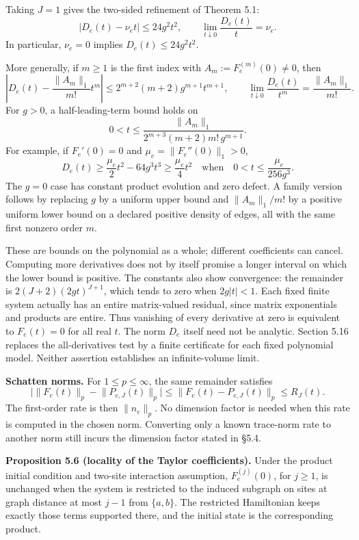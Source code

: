 \documentclass[
  11pt,
]{article}
\begin{document}
Taking \(J=1\) gives the two-sided refinement of Theorem 5.1:
\[
 |D_e(t)-\nu_e t|\leq24g^2t^2,\qquad
 \lim_{t\downarrow0}\frac{D_e(t)}t=\nu_e.
\]
In particular, \(\nu_e=0\) implies \(D_e(t)\leq24g^2t^2\).

More generally, if \(m\geq1\) is the first index with
\(A_m:=F_e^{(m)}(0)\ne0\), then
\[
 \left|D_e(t)-\frac{\lVert A_m\rVert_1}{m!}t^m\right|
 \leq2^{m+2}(m+2)g^{m+1}t^{m+1},
 \qquad
 \lim_{t\downarrow0}\frac{D_e(t)}{t^m}=\frac{\lVert A_m\rVert_1}{m!}.
\]
For \(g>0\), a half-leading-term bound holds on
\[
 0<t\leq
 \frac{\lVert A_m\rVert_1}{2^{m+3}(m+2)m!\,g^{m+1}}.
\]
For example, if \(F_e'(0)=0\) and \(\mu_e=\lVert F_e''(0)\rVert_1>0\),
\[
 D_e(t)\geq\frac{\mu_e}{2}t^2-64g^3t^3
 \geq\frac{\mu_e}{4}t^2
 \quad\text{when}\quad
 0<t\leq\frac{\mu_e}{256g^3}.
\]
The \(g=0\) case has constant product evolution and zero defect.
A family version follows by replacing \(g\) by a uniform upper bound and
\(\lVert A_m\rVert_1/m!\) by a positive uniform lower bound on a declared positive
density of edges, all with the same first nonzero order \(m\).

These are bounds on the polynomial as a whole; different coefficients can
cancel. Computing more derivatives does not by itself promise a longer
interval on which the lower bound is positive. The constants also show
convergence: the remainder is \(2(J+2)(2gt)^{J+1}\), which tends to zero
when \(2g|t|<1\). Each fixed finite system actually has an entire
matrix-valued residual, since matrix exponentials and products are entire.
Thus vanishing of every derivative at zero is equivalent to
\(F_e(t)=0\) for all real \(t\). The norm \(D_e\) itself need not be analytic.
Section 5.16 replaces the all-derivatives test by a finite certificate for each fixed polynomial model. Neither assertion establishes an infinite-volume limit.

\textbf{Schatten norms.} For \(1\leq p\leq\infty\), the same remainder satisfies
\[
 \bigl|\lVert F_e(t)\rVert_p-\lVert P_{e,J}(t)\rVert_p\bigr|
 \leq\lVert F_e(t)-P_{e,J}(t)\rVert_p\leq R_J(t).
\]
The first-order rate is then \(\lVert n_e\rVert_p\). No dimension factor is needed
when this rate is computed in the chosen norm. Converting only a known
trace-norm rate to another norm still incurs the dimension factor stated
in §5.4.

\textbf{Proposition 5.6 (locality of the Taylor coefficients).} Under the product
initial condition and two-site interaction assumption, \(F_e^{(j)}(0)\),
for \(j\geq1\), is unchanged when the system is restricted to the induced
subgraph on sites at graph distance at most \(j-1\) from \(\{a,b\}\).
The restricted Hamiltonian keeps exactly those terms supported there,
and the initial state is the corresponding product.
\end{document}
